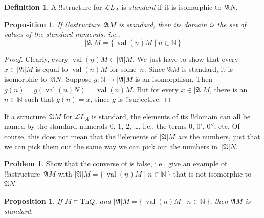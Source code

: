 \documentclass[10pt,a4paper]{article}
\makeatletter
\theoremstyle{plain}
\newtheorem{prop}[thm]{Proposition}
\theoremstyle{definition}
\newtheorem{defn}[thm]{Definition}
\newtheorem{prob}{Problem}[section]
\theoremstyle{remark}
\newenvironment{explain}{}{}
\newcommand*{\ollabel}[1]{\label{#1}}
\newcommand{\olref}{\@ifnextchar[{\olref@i}{\olref@final}}
\def\olref@i[#1]{\@ifnextchar[{\olref@ii}{\olref@final}}
\def\olref@ii[#1]{\@ifnextchar[{\olref@iii}{\olref@final}}
\def\olref@iii[#1]{\olref@final}
\def\olref@final#1{\ref{#1}}
\providecommand{\Obj}{}
\providecommand{\Struct}{\ensuremath{\mathfrak{A}}}
\providecommand{\Domain}{\ensuremath{|\mathfrak{A}|}}
\providecommand{\Sat}[2]{\ensuremath{#1 \models #2}}
\providecommand{\Lang}{\ensuremath{\mathcal{L}}}
\providecommand{\Th}{\ensuremath{\mathrm{Th}}}
\providecommand{\num}[1]{\underline{#1}}
\providecommand{\Nat}{\ensuremath{\mathbb{N}}}
\providecommand{\Setabs}[2]{\{\, #1 \mid #2 \,\}}
\providecommand{\Value}[1]{\operatorname{val}(#1)}
\makeatother
\begin{document}
\begin{defn}
A !!{structure} for $\Lang{L_A}$ is \emph{standard} if it is
isomorphic to~$\Struct{N}$.
\end{defn}

\begin{prop}
\ollabel{prop:standard-domain} If !!a{structure}~$\Struct{M}$ is standard,
then its domain is the set of values of the standard numerals, i.e.,
\[
\Domain{M} = \Setabs{\Value{\num{n}}{M}}{n \in \Nat}
\]
\end{prop}

\begin{proof}
Clearly, every $\Value{\num{n}}{M} \in \Domain{M}$. We just have to
show that every $x \in \Domain{M}$ is equal to $\Value{\num{n}}{M}$
for some~$n$.  Since $\Struct{M}$ is standard, it is isomorphic
to~$\Struct{N}$. Suppose $g\colon \Nat \to \Domain{M}$ is an
isomorphism. Then $g(n) = g(\Value{\num{n}}{N}) =
\Value{\num{n}}{M}$. But for every $x \in \Domain{M}$, there is an~$n
\in \Nat$ such that $g(n) = x$, since $g$ is !!{surjective}.
\end{proof}

\begin{explain}
If a structure~$\Struct{M}$ for $\Lang{L_A}$ is standard, the elements
of its !!{domain} can all be named by the standard numerals $\num{0}$,
$\num{1}$, $\num{2}$, \dots, i.e., the terms $\Obj{0}$, $\Obj{0}'$,
$\Obj{0}''$, etc. Of course, this does not mean that the !!{element}s
of $\Domain{M}$ \emph{are} the numbers, just that we can pick them out
the same way we can pick out the numbers in~$\Domain{N}$.
\end{explain}

\begin{prob}
Show that the converse of \olref[mod][mar][stm]{prop:standard-domain}
is false, i.e., give an example of !!a{structure}~$\Struct{M}$ with
$\Domain{M} = \Setabs{\Value{\num{n}}{M}}{n \in \Nat}$ that is not
isomorphic to~$\Struct{N}$.
\end{prob}

\begin{prop}
\ollabel{prop:thq-standard}
If $\Sat{M}{\Th{Q}}$, and $\Domain{M} = \Setabs{\Value{\num{n}}{M}}{n
  \in \Nat}$, then $\Struct{M}$ is standard.
\end{prop}
\end{document}
